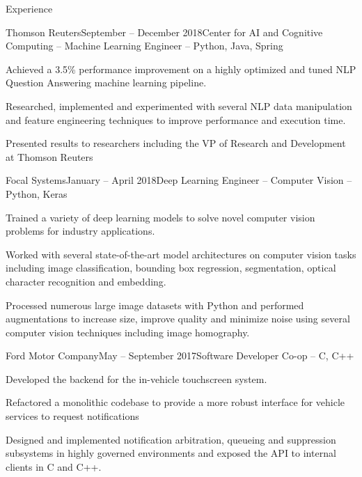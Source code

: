 \documentclass{resume} %
\begin{document}
\begin{rSection}{Experience}

\begin{rSubsection}{Thomson Reuters}{September -- December 2018}{Center for AI and Cognitive Computing -- Machine Learning Engineer -- Python, Java, Spring}{}
\item Achieved a 3.5\% performance improvement on a highly optimized and tuned NLP Question Answering machine learning pipeline.

\item Researched, implemented and experimented with several NLP data manipulation and feature engineering techniques to improve performance and execution time.
\item Presented results to researchers including the 
VP of Research and Development at Thomson Reuters
\end{rSubsection}

\begin{rSubsection}{Focal Systems}{January -- April 2018}{Deep Learning Engineer -- Computer Vision -- Python, Keras}{}
	\item Trained a variety of deep learning models to solve novel computer vision problems for industry applications.
	
		\item Worked with several state-of-the-art model architectures on computer vision tasks including image classification, bounding box regression, segmentation, optical character recognition and embedding.
	\item Processed numerous large image datasets with Python and performed augmentations to increase size, improve quality and minimize noise using several computer vision techniques including image homography.
\end{rSubsection}

\begin{rSubsection}{Ford Motor Company}{May -- September 2017}{Software Developer Co-op -- C, C++}{}

\item Developed the backend for the in-vehicle touchscreen system. 
\item Refactored a monolithic codebase to provide a more robust interface for vehicle services to request notifications
\item Designed and implemented notification arbitration, queueing and suppression subsystems in highly governed environments and exposed the API to internal clients in C and C++.


\end{rSubsection}
\end{rSection}
\end{document}
